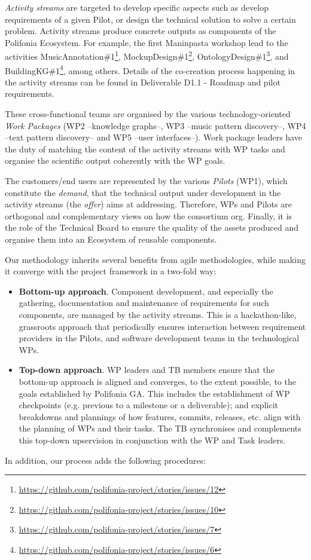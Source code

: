 \textit{Activity streams} are targeted to develop specific aspects such as develop requirements of a given Pilot, or design the technical solution to solve a certain problem.
Activity streams produce concrete outputs as components of the Polifonia Ecosystem.
For example, the first Maninpasta workshop lead to the activities MusicAnnotation\#1\footnote{\url{https://github.com/polifonia-project/stories/issues/12}}, MockupDesign\#1\footnote{\url{https://github.com/polifonia-project/stories/issues/10}}, OntologyDesign\#1\footnote{\url{https://github.com/polifonia-project/stories/issues/7}}, and  BuildingKG\#1\footnote{\url{https://github.com/polifonia-project/stories/issues/6}}, among others.
Details of the co-creation process happening in the activity streams can be found in Deliverable D1.1 - Roadmap and pilot requirements.

These cross-functional teams are organised by the various technology-oriented \textit{Work Packages} (WP2 --knowledge graphs--, WP3 --music pattern discovery--, WP4 --text pattern discovery-- and WP5 --user interfaces--). 
Work package leaders have the duty of matching the content of the activity streams with WP tasks and organise the scientific output coherently with the WP goals.

The customers/end users are represented by the various \textit{Pilots} (WP1), which constitute the \textit{demand}, that the technical output under development in the activity streams (the \textit{offer}) aims at addressing. 
Therefore, WPs and Pilots are orthogonal and complementary views on how the consortium org.
Finally, it is the role of the Technical Board to ensure the quality of the assets produced and organise them into an Ecosystem of reusable components.

Our methodology inherits several benefits from agile methodologies, while making it converge with the project framework in a two-fold way:
\begin{itemize}
    \item \textbf{Bottom-up approach}. Component development, and especially the gathering, documentation and maintenance of requirements for such components, are managed by the activity streams. This is a hackathon-like, grassroots approach that periodically ensures interaction between requirement providers in the Pilots, and software development teams in the technological WPs.
    \item \textbf{Top-down approach}. WP leaders and TB members ensure that the bottom-up approach is aligned and converges, to the extent possible, to the goals established by Polifonia GA. This includes the establishment of WP checkpoints (e.g. previous to a milestone or a deliverable); and explicit breakdowns and plannings of how features, commits, releases, etc. align with the planning of WPs and their tasks. The TB synchronises and complements this top-down upservision in conjunction with the WP and Task leaders.
\end{itemize}
In addition, our process adds the following procedures:

